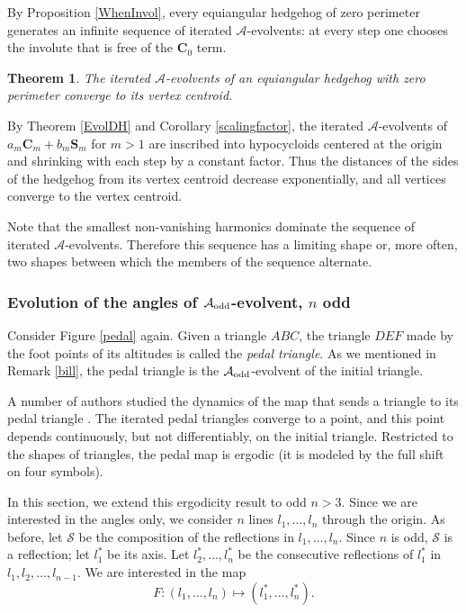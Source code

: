 \documentclass[12pt]{article}
\makeatletter
\newtheorem{theorem}{Theorem}
\renewenvironment{proof}[1][\proofname] 
{\par\pushQED{\qed}\normalfont\topsep6\p@\@plus6\p@\relax\trivlist\item[\hskip\labelsep\bfseries#1\@addpunct{.}]\ignorespaces}{\popQED\endtrivlist\@endpefalse}
\newcommand{\Aev}{\mathcal{A}}
\makeatother
\begin{document}
By Proposition \ref{WhenInvol}, every equiangular hedgehog of zero perimeter generates an infinite sequence of iterated $\Aev$-evolvents: at every step one chooses the involute that is free of the $\mathbf{C}_0$ term.

\begin{theorem}\label{AInvolEqui}
The iterated $\Aev$-evolvents of an equiangular hedgehog with zero perimeter converge to its vertex centroid.
\end{theorem}
\begin{proof}
By Theorem \ref{EvolDH} and Corollary \ref{scalingfactor}, the iterated $\Aev$-evolvents of $a_m \mathbf{C}_m + b_m \mathbf{S}_m$ for $m > 1$ are inscribed into hypocycloids centered at the origin and shrinking with each step by a constant factor. Thus the distances of the sides of the hedgehog from its vertex centroid decrease exponentially, and all vertices converge to the vertex centroid.
\end{proof}

Note that the smallest non-vanishing harmonics dominate the sequence of iterated $\Aev$-evolvents. Therefore this sequence has a limiting shape or, more often, two shapes between which the members of the sequence alternate.

\subsubsection{Evolution of the angles of $\Aev_{\rm odd}$-evolvent, $n$ odd}

Consider Figure \ref{pedal} again. Given a triangle $ABC$, the triangle $DEF$ made by the foot points of its altitudes is called the {\it pedal triangle}.  As we mentioned in Remark \ref{bill}, the pedal triangle is the $\Aev_{\rm odd}$-evolvent of the initial triangle. 

A number of authors studied the dynamics of the map that sends a triangle to its pedal triangle \cite{KS,Lax,Un,Al,Ma}. The iterated pedal triangles converge to a point, and this point depends continuously, but not differentiably, on the initial triangle. Restricted to the shapes of triangles, the pedal map is ergodic  (it is modeled by the full shift on four symbols).

In this section, we extend this ergodicity result to odd $n>3$. Since we are interested in the angles only, we consider $n$ lines $l_1,\ldots,l_n$ through the origin. As before, let $\mathcal S$ be the composition of the reflections in $l_1,\ldots,l_n$. Since $n$ is odd, $\mathcal S$ is a reflection; let $l^*_1$ be its axis. Let $l^*_2,\ldots,l^*_n$ be the consecutive reflections of $l^*_1$ in $l_1, l_2,\ldots, l_{n-1}$. We are interested in the map
$$
F: (l_1,\ldots,l_n) \mapsto (l^*_1,\ldots,l^*_n).
$$
\end{document}
